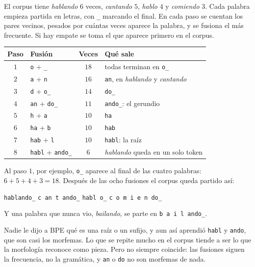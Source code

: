 \documentclass[11pt,letterpaper]{article}
\begin{document}
\begin{ejemplo}
    El corpus tiene \textit{hablando} $6$ veces, \textit{cantando} $5$,
    \textit{hablo} $4$ y \textit{comiendo} $3$. Cada palabra empieza
    partida en letras, con \texttt{\_} marcando el final. En cada paso
    se cuentan los pares vecinos, pesados por cuántas veces aparece la
    palabra, y se fusiona el más frecuente. Si hay empate se toma el
    que aparece primero en el corpus.
    \begin{center}
    \small
    \begin{tabular}{clcl}
        \toprule
        \textbf{Paso} & \textbf{Fusión} & \textbf{Veces}
        & \textbf{Qué sale} \\
        \midrule
        $1$ & \texttt{o} + \texttt{\_}     & $18$
            & todas terminan en \texttt{o\_} \\
        $2$ & \texttt{a} + \texttt{n}      & $16$
            & \texttt{an}, en \textit{hablando} y \textit{cantando} \\
        $3$ & \texttt{d} + \texttt{o\_}    & $14$ & \texttt{do\_} \\
        $4$ & \texttt{an} + \texttt{do\_}  & $11$
            & \texttt{ando\_}: el gerundio \\
        $5$ & \texttt{h} + \texttt{a}      & $10$ & \texttt{ha} \\
        $6$ & \texttt{ha} + \texttt{b}     & $10$ & \texttt{hab} \\
        $7$ & \texttt{hab} + \texttt{l}    & $10$
            & \texttt{habl}: la raíz \\
        $8$ & \texttt{habl} + \texttt{ando\_} & $6$
            & \textit{hablando} queda en un solo token \\
        \bottomrule
    \end{tabular}
    \end{center}
    Al paso $1$, por ejemplo, \texttt{o\_} aparece al final de las
    cuatro palabras: $6 + 5 + 4 + 3 = 18$. Después de las ocho fusiones
    el corpus queda partido así:
    \begin{center}
    \texttt{hablando\_} \qquad \texttt{c an t ando\_} \qquad
    \texttt{habl o\_} \qquad \texttt{c o m i e n do\_}
    \end{center}
    Y una palabra que nunca vio, \textit{bailando}, se parte en
    \texttt{b a i l ando\_}.
\end{ejemplo}

\begin{idea}
    Nadie le dijo a BPE qué es una raíz o un sufijo, y aun así
    aprendió \texttt{habl} y \texttt{ando}, que son casi los morfemas.
    Lo que se repite mucho en el corpus tiende a ser lo que la
    morfología reconoce como pieza. Pero no siempre coincide: las
    fusiones siguen la frecuencia, no la gramática, y
    \texttt{an} o \texttt{do} no son morfemas de nada.
\end{idea}
\end{document}
